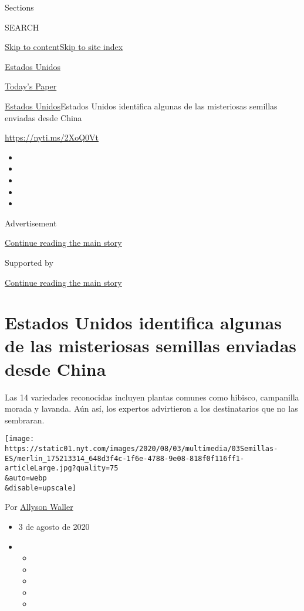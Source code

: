Sections

SEARCH

\protect\hyperlink{site-content}{Skip to
content}\protect\hyperlink{site-index}{Skip to site index}

\href{https://www.nytimes.com/es/section/estados-unidos}{Estados Unidos}

\href{https://myaccount.nytimes.com/auth/login?response_type=cookie\&client_id=vi}{}

\href{https://www.nytimes.com/section/todayspaper}{Today's Paper}

\href{/es/section/estados-unidos}{Estados Unidos}\textbar{}Estados
Unidos identifica algunas de las misteriosas semillas enviadas desde
China

\url{https://nyti.ms/2XoQ0Vt}

\begin{itemize}
\item
\item
\item
\item
\item
\end{itemize}

Advertisement

\protect\hyperlink{after-top}{Continue reading the main story}

Supported by

\protect\hyperlink{after-sponsor}{Continue reading the main story}

\hypertarget{estados-unidos-identifica-algunas-de-las-misteriosas-semillas-enviadas-desde-china}{%
\section{Estados Unidos identifica algunas de las misteriosas semillas
enviadas desde
China}\label{estados-unidos-identifica-algunas-de-las-misteriosas-semillas-enviadas-desde-china}}

Las 14 variedades reconocidas incluyen plantas comunes como hibisco,
campanilla morada y lavanda. Aún así, los expertos advirtieron a los
destinatarios que no las sembraran.

\texttt{[image: https://static01.nyt.com/images/2020/08/03/multimedia/03Semillas-ES/merlin\_175213314\_648d3f4c-1f6e-4788-9e08-818f0f116ff1-articleLarge.jpg?quality=75\\\&auto=webp\\\&disable=upscale]}

Por \href{https://www.nytimes.com/by/allyson-waller}{Allyson Waller}

\begin{itemize}
\item
  3 de agosto de 2020
\item
  \begin{itemize}
  \item
  \item
  \item
  \item
  \item
  \end{itemize}
\end{itemize}

